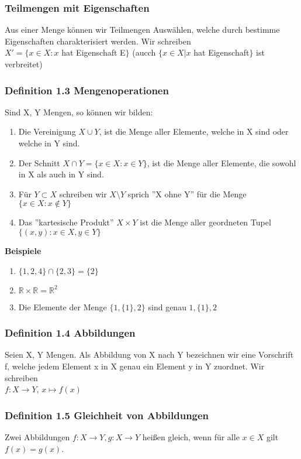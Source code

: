 \documentclass{article}
\newcommand{\R}{\mathbb{R}}
\begin{document}
\subsubsection{Teilmengen mit Eigenschaften}
Aus einer Menge können wir Teilmengen Auswählen, welche durch bestimme Eigenschaften charakterisiert werden. Wir schreiben\\
$X' = \{x \in X : x $ hat Eigenschaft E$\}$ (aucch $\{x \in X | x $ hat Eigenschaft$\}$ ist verbreitet)

\subsubsection{Definition 1.3 Mengenoperationen }
Sind X, Y Mengen, so können wir bilden:
\begin{enumerate}
\item{Die Vereinigung $X \cup Y$, ist die Menge aller Elemente, welche in X sind oder welche in Y sind.}
\item{Der Schnitt $X \cap Y = \{x \in X : x \in Y\}$, ist die Menge aller Elemente, die sowohl in X als auch in Y sind.}
\item{Für $Y \subset X$ schreiben wir $X \setminus Y$ sprich ''X ohne Y'' für die Menge $\{x \in X : x \not\in Y\}$}
\item{Das ''kartesische Produkt'' $X \times Y$ ist die Menge aller geordneten Tupel $\{(x, y) : x\in X, y\in Y\}$ }
\end{enumerate}
\textbf{Beispiele}
\begin{enumerate}
\item{$\{1, 2, 4\} \cap \{2, 3\} = \{2\}$}
\item{$\R \times \R = \R^2$}
\item{Die Elemente der Menge $\{1, \{1\}, 2\}$ sind genau $1, \{1\}, 2$ }
\end{enumerate}

\subsubsection{Definition 1.4 Abbildungen}
Seien X, Y Mengen. Als Abbildung von X nach Y bezeichnen wir eine Vorschrift f, welche jedem Element x in X genau ein Element y in Y zuordnet. Wir schreiben\\
$f : X \rightarrow Y$, $x \mapsto f(x)$

\subsubsection{Definition 1.5 Gleichheit von Abbildungen}
Zwei Abbildungen $f : X \rightarrow Y, g : X \rightarrow Y$ hei\ss{}en gleich, wenn für alle $x \in X$ gilt $f(x) = g(x)$.
\end{document}
